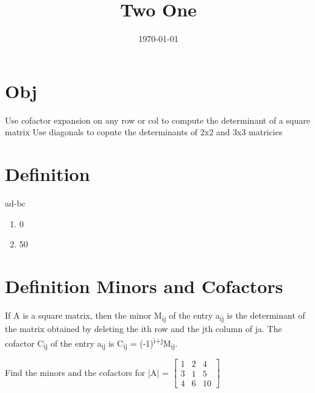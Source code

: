 \documentclass[11pt]{article}
\date{\today}
\title{Two One}
\begin{document}
\maketitle
\tableofcontents

\section{Obj}
\label{sec:org8c7c88e}
Use cofactor expansion on any row or col to compute the determinant of a square matrix
Use diagonals to copute the determinants of 2x2 and 3x3 matricies
\section{Definition}
\label{sec:org9c23a0a}
ad-bc

\begin{enumerate}
\item 0
\item 50
\end{enumerate}
\section{Definition Minors and Cofactors}
\label{sec:orgf302313}
If A is a square matrix, then the minor M\textsubscript{ij} of the entry a\textsubscript{ij} is the determinant of the matrix obtained by deleting the ith row and the jth column of ja. The cofactor C\textsubscript{ij} of the entry a\textsubscript{ij} is C\textsubscript{ij} = (-1)\textsuperscript{i+j}M\textsubscript{ij}.

Find the minors and the cofactors for |A| = \(\begin{bmatrix}1&2&4\\3&1&5\\4&6&10\end{bmatrix}\)
\end{document}
